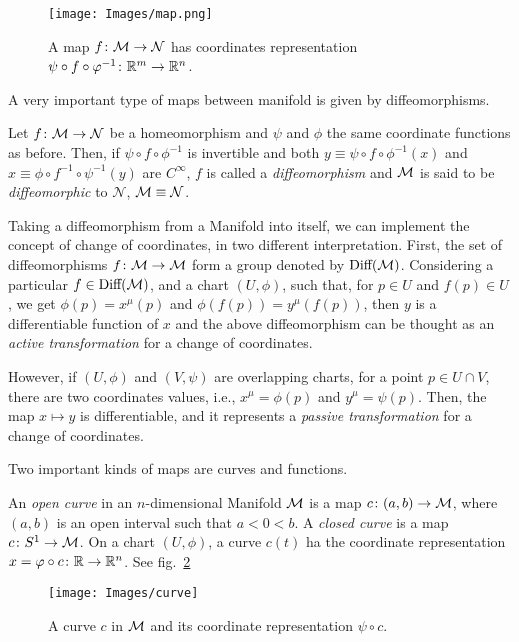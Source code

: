 \begin{figure}
    \centering
    \texttt{[image: Images/map.png]}
    \caption{A map $f \colon \mathcal{M} \to \mathcal{N}$ has coordinates representation $\psi \circ f \circ \varphi^{-1} \colon \mathbb{R}^m \to \mathbb{R}^n$.}
    \label{fig:map}
\end{figure}

A very important type of maps between manifold is given by diffeomorphisms.
\begin{definition}[Diffeomorphism]
    Let $f \colon \mathcal{M} \to \mathcal{N}$ be a homeomorphism and $\psi$ and $\phi$ the same coordinate functions as before. Then, if $\psi \circ f \circ \phi^{-1}$ is invertible and both $y \equiv \psi \circ f \circ \phi^{-1}(x)$ and $x \equiv \phi \circ f^{-1} \circ \psi^{-1}(y)$ are $C^\infty$, $f$ is called a \emph{diffeomorphism} and $\mathcal{M}$ is said to be \emph{diffeomorphic} to $\mathcal{N}$, $\mathcal{M} \equiv \mathcal{N}$.
\end{definition}

Taking a diffeomorphism from a Manifold into itself, we can implement the concept of change of coordinates, in two different interpretation. First, the set of diffeomorphisms $f\colon \mathcal{M} \to \mathcal{M}$ form a group denoted by $\textup{Diff}(\mathcal{M})$. Considering a particular $f \in \textup{Diff}(\mathcal{M})$, and a chart $(U, \phi)$, such that, for $p \in U$ and $f(p) \in U$, we get $\phi(p) = x^\mu(p)$ and $\phi(f(p))=y^\mu(f(p))$, then $y$ is a differentiable function of $x$ and the above diffeomorphism can be thought as an \emph{active transformation} for a change of coordinates.

However, if $(U,\phi)$ and $(V,\psi)$ are overlapping charts, for a point $p \in U \cap V$, there are two coordinates values, i.e., $x^\mu = \phi(p)$ and $y^\mu = \psi(p)$. Then, the map $x \mapsto y$ is differentiable, and it represents a \emph{passive transformation} for a change of coordinates.

Two important kinds of maps are curves and functions.

\begin{definition}[Curve]
    An \emph{open curve} in an $n$-dimensional Manifold $\mathcal{M}$ is a map $c \colon (a,b) \to \mathcal{M}$, where $(a,b)$ is an open interval such that $a<0<b$. A \emph{closed curve} is a map $c \colon S^1 \to \mathcal{M}$. On a chart $(U,\phi)$, a curve $c(t)$ ha the coordinate representation $x=\varphi \circ c \colon \mathbb{R} \to \mathbb{R}^n$. See fig.~\ref{fig:curve}
\end{definition}

\begin{figure}
    \centering
    \texttt{[image: Images/curve]}
    \caption{A curve $c$ in $\mathcal{M}$ and its coordinate representation $\psi \circ c$.}
    \label{fig:curve}
\end{figure}

